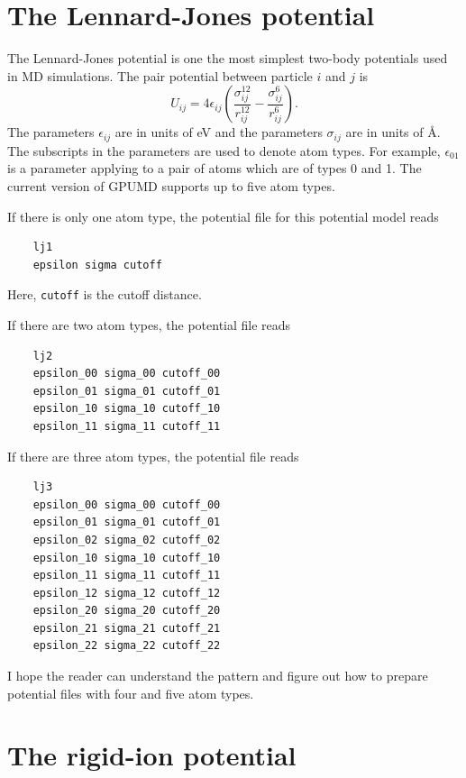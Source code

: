 \documentclass[12pt,a4paper]{report}
\begin{document}
\section{The Lennard-Jones potential}

The Lennard-Jones potential is one the most simplest two-body potentials used in MD simulations. The pair potential between particle $i$ and $j$ is
\begin{equation}
U_{ij} = 4 \epsilon_{ij}
\left(
\frac{ \sigma_{ij}^{12} }{ r_{ij}^{12} } -
\frac{\sigma_{ij}^{6} }{ r_{ij}^{6} }
\right).
\end{equation}
The parameters $\epsilon_{ij}$ are in units of eV and the parameters $\sigma_{ij}$ are in units of \AA. The subscripts in the parameters are used to denote atom types. For example, $\epsilon_{01}$ is a parameter applying to a pair of atoms which are of types 0 and 1. The current version of GPUMD supports up to five atom types. 

If there is only one atom type, the potential file for this potential model reads
\begin{verbatim}
    lj1
    epsilon sigma cutoff
\end{verbatim}
Here, \verb"cutoff" is the cutoff distance.

If there are two atom types, the potential file reads
\begin{verbatim}
    lj2
    epsilon_00 sigma_00 cutoff_00
    epsilon_01 sigma_01 cutoff_01
    epsilon_10 sigma_10 cutoff_10
    epsilon_11 sigma_11 cutoff_11
\end{verbatim}

If there are three atom types, the potential file reads
\begin{verbatim}
    lj3
    epsilon_00 sigma_00 cutoff_00
    epsilon_01 sigma_01 cutoff_01
    epsilon_02 sigma_02 cutoff_02
    epsilon_10 sigma_10 cutoff_10
    epsilon_11 sigma_11 cutoff_11
    epsilon_12 sigma_12 cutoff_12
    epsilon_20 sigma_20 cutoff_20
    epsilon_21 sigma_21 cutoff_21
    epsilon_22 sigma_22 cutoff_22
\end{verbatim}

I hope the reader can understand the pattern and figure out how to prepare potential files with four and five atom types. 


\section{The rigid-ion potential}
\end{document}
